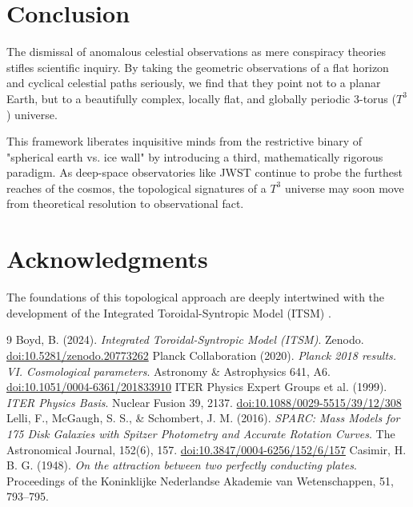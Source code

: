 \documentclass[aps,prd,11pt,onecolumn,superscriptaddress,nofootinbib,floatfix]{revtex4-2}
\begin{document}
\section{Conclusion}
\label{sec:conclusion}

The dismissal of anomalous celestial observations as mere conspiracy theories stifles scientific inquiry. By taking the geometric observations of a flat horizon and cyclical celestial paths seriously, we find that they point not to a planar Earth, but to a beautifully complex, locally flat, and globally periodic 3-torus ($T^3$) universe. 

This framework liberates inquisitive minds from the restrictive binary of "spherical earth vs. ice wall" by introducing a third, mathematically rigorous paradigm. As deep-space observatories like JWST continue to probe the furthest reaches of the cosmos, the topological signatures of a $T^3$ universe may soon move from theoretical resolution to observational fact.

\section*{Acknowledgments}
The foundations of this topological approach are deeply intertwined with the development of the Integrated Toroidal-Syntropic Model (ITSM) \cite{itsm_main}. 


\begin{thebibliography}{9}
 Boyd, B. (2024). \textit{Integrated Toroidal-Syntropic Model (ITSM)}. Zenodo. \href{https://doi.org/10.5281/zenodo.20773262}{doi:10.5281/zenodo.20773262}
 Planck Collaboration (2020). \textit{Planck 2018 results. VI. Cosmological parameters}. Astronomy \& Astrophysics 641, A6. \href{https://doi.org/10.1051/0004-6361/201833910}{doi:10.1051/0004-6361/201833910}
 ITER Physics Expert Groups et al. (1999). \textit{ITER Physics Basis}. Nuclear Fusion 39, 2137. \href{https://doi.org/10.1088/0029-5515/39/12/308}{doi:10.1088/0029-5515/39/12/308}
 Lelli, F., McGaugh, S. S., \& Schombert, J. M. (2016). \textit{SPARC: Mass Models for 175 Disk Galaxies with Spitzer Photometry and Accurate Rotation Curves}. The Astronomical Journal, 152(6), 157. \href{https://doi.org/10.3847/0004-6256/152/6/157}{doi:10.3847/0004-6256/152/6/157}
 Casimir, H. B. G. (1948). \textit{On the attraction between two perfectly conducting plates}. Proceedings of the Koninklijke Nederlandse Akademie van Wetenschappen, 51, 793–795.
\end{thebibliography}
\end{document}
